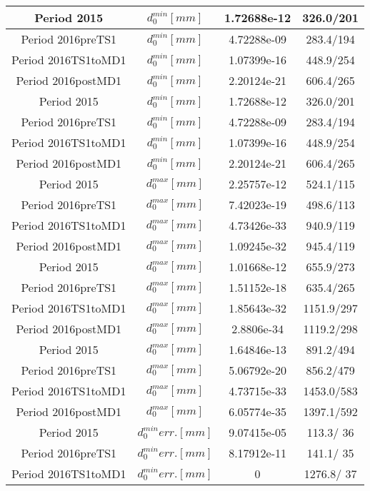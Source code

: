 \documentclass{article}
\begin{document}
\begin{longtable}{c|c|c|c}
\hline
 Period 2015 & $d_{0}^{min} [mm]$ & 1.72688e-12 & 326.0/201\\
\hline
 Period 2016preTS1 & $d_{0}^{min} [mm]$ & 4.72288e-09 & 283.4/194\\
\hline
 Period 2016TS1toMD1 & $d_{0}^{min} [mm]$ & 1.07399e-16 & 448.9/254\\
\hline
 Period 2016postMD1 & $d_{0}^{min} [mm]$ & 2.20124e-21 & 606.4/265\\
\hline
 Period 2015 & $d_{0}^{min} [mm]$ & 1.72688e-12 & 326.0/201\\
\hline
 Period 2016preTS1 & $d_{0}^{min} [mm]$ & 4.72288e-09 & 283.4/194\\
\hline
 Period 2016TS1toMD1 & $d_{0}^{min} [mm]$ & 1.07399e-16 & 448.9/254\\
\hline
 Period 2016postMD1 & $d_{0}^{min} [mm]$ & 2.20124e-21 & 606.4/265\\
\hline
 Period 2015 & $d_{0}^{max} [mm]$ & 2.25757e-12 & 524.1/115\\
\hline
 Period 2016preTS1 & $d_{0}^{max} [mm]$ & 7.42023e-19 & 498.6/113\\
\hline
 Period 2016TS1toMD1 & $d_{0}^{max} [mm]$ & 4.73426e-33 & 940.9/119\\
\hline
 Period 2016postMD1 & $d_{0}^{max} [mm]$ & 1.09245e-32 & 945.4/119\\
\hline
 Period 2015 & $d_{0}^{max} [mm]$ & 1.01668e-12 & 655.9/273\\
\hline
 Period 2016preTS1 & $d_{0}^{max} [mm]$ & 1.51152e-18 & 635.4/265\\
\hline
 Period 2016TS1toMD1 & $d_{0}^{max} [mm]$ & 1.85643e-32 & 1151.9/297\\
\hline
 Period 2016postMD1 & $d_{0}^{max} [mm]$ & 2.8806e-34 & 1119.2/298\\
\hline
 Period 2015 & $d_{0}^{max} [mm]$ & 1.64846e-13 & 891.2/494\\
\hline
 Period 2016preTS1 & $d_{0}^{max} [mm]$ & 5.06792e-20 & 856.2/479\\
\hline
 Period 2016TS1toMD1 & $d_{0}^{max} [mm]$ & 4.73715e-33 & 1453.0/583\\
\hline
 Period 2016postMD1 & $d_{0}^{max} [mm]$ & 6.05774e-35 & 1397.1/592\\
\hline
 Period 2015 & $d_{0}^{min} err. [mm]$ & 9.07415e-05 & 113.3/ 36\\
\hline
 Period 2016preTS1 & $d_{0}^{min} err. [mm]$ & 8.17912e-11 & 141.1/ 35\\
\hline
 Period 2016TS1toMD1 & $d_{0}^{min} err. [mm]$ & 0 & 1276.8/ 37\\

\end{longtable}
\end{document}
